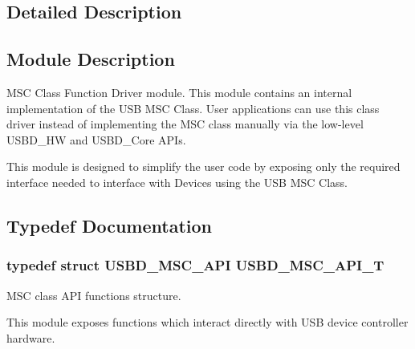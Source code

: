\subsection{Detailed Description}
\hypertarget{group__USBD__MSC_Sec_MSCModDescription}{}\subsection{Module Description}\label{group__USBD__MSC_Sec_MSCModDescription}
M\+SC Class Function Driver module. This module contains an internal implementation of the U\+SB M\+SC Class. User applications can use this class driver instead of implementing the M\+SC class manually via the low-\/level U\+S\+B\+D\+\_\+\+HW and U\+S\+B\+D\+\_\+\+Core A\+P\+Is.

This module is designed to simplify the user code by exposing only the required interface needed to interface with Devices using the U\+SB M\+SC Class. 

\subsection{Typedef Documentation}
\subsubsection[{\texorpdfstring{U\+S\+B\+D\+\_\+\+M\+S\+C\+\_\+\+A\+P\+I\+\_\+T}{USBD_MSC_API_T}}]{\setlength{\rightskip}{0pt plus 5cm}typedef struct {\bf U\+S\+B\+D\+\_\+\+M\+S\+C\+\_\+\+A\+PI}  {\bf U\+S\+B\+D\+\_\+\+M\+S\+C\+\_\+\+A\+P\+I\+\_\+T}}\hypertarget{group__USBD__MSC_ga521bb0e0edf4060aeb10827c6c29f7cf}{}\label{group__USBD__MSC_ga521bb0e0edf4060aeb10827c6c29f7cf}


M\+SC class A\+PI functions structure.

This module exposes functions which interact directly with U\+SB device controller hardware. 

